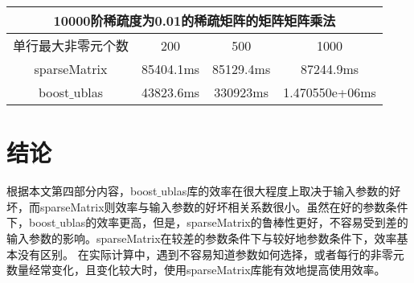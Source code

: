 \begin{tabular}{|c|c|c|c|}
\hline \multicolumn{4}{|c|}{10000阶稀疏度为0.01的稀疏矩阵的矩阵矩阵乘法}\\
\hline 单行最大非零元个数&200&500&1000\\
\hline sparseMatrix&85404.1ms&85129.4ms&87244.9ms\\
\hline boost$\_$ublas&43823.6ms&330923ms&1.470550e+06ms\\
\hline
\end{tabular}



\chapter{结论}
根据本文第四部分内容，boost$\_$ublas库的效率在很大程度上取决于输入参数的好坏，而sparseMatrix则效率与输入参数的好坏相关系数很小。虽然在好的参数条件下，boost$\_$ublas的效率更高，但是，sparseMatrix的鲁棒性更好，不容易受到差的输入参数的影响。sparseMatrix在较差的参数条件下与较好地参数条件下，效率基本没有区别。
\newline
在实际计算中，遇到不容易知道参数如何选择，或者每行的非零元数量经常变化，且变化较大时，使用sparseMatrix库能有效地提高使用效率。







